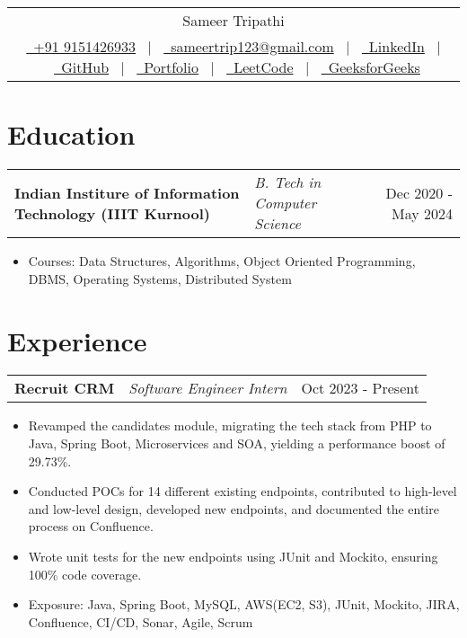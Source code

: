 \documentclass[a4paper,10pt]{article}
\makeatletter
\newenvironment{joblong}[3]
    {
    \begin{tabularx}{\linewidth}{@{}l X r@{}}
    \textbf{#1} & \textit{#2} &  #3 \\[3pt]
    \end{tabularx}
    \begin{minipage}[t]{\linewidth}
    \begin{itemize}[nosep,after=\strut, leftmargin=1em, itemsep=2pt,label=--]
    }
    {
    \end{itemize}
    \end{minipage}    
    }
\makeatother
\begin{document}
\pagestyle{empty} 


\begin{tabularx}{\linewidth}{@{} C @{}}
\Huge{Sameer Tripathi} \\[8pt]
\href{tel:+919151426933}{\ +91 9151426933} \ $|$ \
\href{mailto:sameertrip123@gmail.com}{\ sameertrip123@gmail.com} \ $|$ \
\href{https://linkedin.com/in/sameertri039}{\ LinkedIn} \ $|$ \ 
\href{https://github.com/sameertrip123}{\ GitHub} \ $|$ \ 
\href{https://sameertrip123.github.io/portfolio/}{\ Portfolio}  \ $|$ \ 
\href{https://leetcode.com/u/sameertri039/}{\ LeetCode} \ $|$ \
\href{https://www.geeksforgeeks.org/user/sameertri039/}{\ GeeksforGeeks}  \\
\end{tabularx}


\section{Education}
\vspace{-4pt}
\begin{joblong}{Indian Institure of Information Technology (IIIT Kurnool)}{B. Tech in Computer Science}{Dec 2020 - May 2024}
    \item Courses: Data Structures, Algorithms, Object Oriented Programming, DBMS, Operating Systems, Distributed System
\end{joblong}
\vspace{-16pt}

\section{Experience}
\vspace{-4pt}
\begin{joblong}{Recruit CRM}{Software Engineer Intern}{Oct 2023 - Present}
    \item Revamped the candidates module, migrating the tech stack from PHP to Java, Spring Boot, Microservices and SOA, yielding a performance boost of 29.73\%.
    \item Conducted POCs for 14 different existing endpoints, contributed to high-level and low-level design, developed new endpoints, and documented the entire process on Confluence.
    \item Wrote unit tests for the new endpoints using JUnit and Mockito, ensuring 100\% code coverage.
    \item Exposure: Java, Spring Boot, MySQL, AWS(EC2, S3), JUnit, Mockito, JIRA, Confluence, CI/CD, Sonar, Agile, Scrum
\end{joblong}
\end{document}
